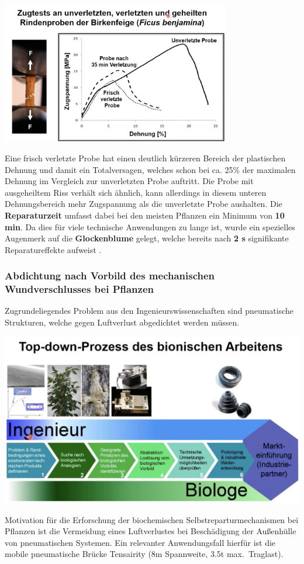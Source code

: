 \begin{center}
    \includegraphics[width=10cm]{lec5/figures/sd.png}
\end{center}
Eine frisch verletzte Probe hat einen deutlich kürzeren Bereich der plastischen Dehnung und damit ein Totalversagen, welches schon bei ca. 25\% der maximalen Dehnung im Vergleich zur unverletzten Probe auftritt. Die Probe mit ausgeheiltem Riss verhält sich ähnlich, kann allerdings in diesem unteren Dehnungsbereich mehr Zugspannung als die unverletzte Probe aushalten. Die \textbf{Reparaturzeit} umfasst dabei bei den meisten Pflanzen ein Minimum von \textbf{10 min}. Da dies für viele technische Anwendungen zu lange ist, wurde ein spezielles Augenmerk auf die \textbf{Glockenblume} gelegt, welche bereits nach \textbf{2 s} signifikante Reparatureffekte aufweist \dangersign.

\vspace*{2\baselineskip}

\subsubsection{Abdichtung nach Vorbild des mechanischen Wundverschlusses bei Pflanzen}

Zugrundeliegendes Problem aus den Ingenieurswissenschaften sind pneumatische Strukturen, welche gegen Luftverlust abgedichtet werden müssen.

\begin{center}
    \includegraphics[width=14cm]{lec5/figures/top-down.png}
\end{center}
Motivation für die Erforschung der biochemischen Selbstreparturmechanismen bei Pflanzen ist die Vermeidung eines Luftverlustes bei Beschädigung der Außenhülle von pneumatischen Systemen. Ein relevanter Anwendungsfall hierfür ist die mobile pneumatische Brücke Tensairity (8m Spannweite, 3.5t max.\ Traglast).\\

